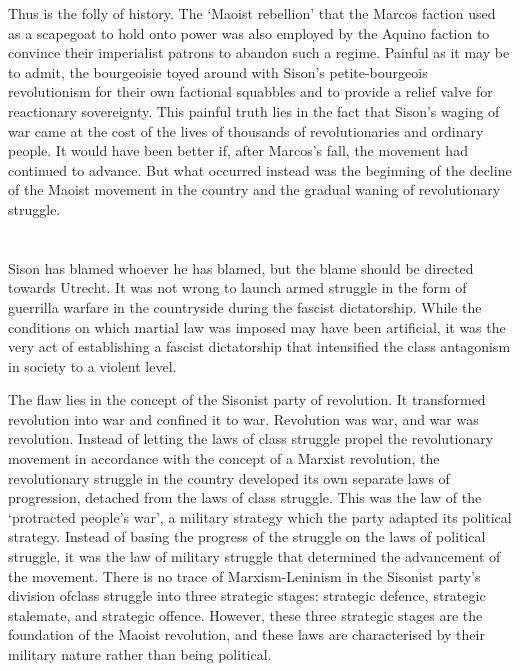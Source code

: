 Thus is the folly of history.
The `Maoist rebellion' that the Marcos faction used 
as a scapegoat to hold onto power 
was also employed by the Aquino faction 
to convince their imperialist patrons 
to abandon such a regime. 
Painful as it may be to admit, 
the bourgeoisie toyed around with Sison's petite-bourgeois revolutionism 
for their own factional squabbles 
and to provide a relief valve for reactionary sovereignty. 
This painful truth lies in the fact 
that Sison's waging of war 
came at the cost of the lives 
of thousands of revolutionaries and ordinary people. 
It would have been better if, after Marcos's fall, 
the movement had continued to advance. 
But what occurred instead was 
the beginning of the decline 
of the Maoist movement in the country 
and the gradual waning of revolutionary struggle.


\section{}
Sison has blamed whoever he has blamed,
but the blame should be directed towards Utrecht.
It was not wrong to launch armed struggle 
in the form of guerrilla warfare in the countryside 
during the fascist dictatorship. 
While the conditions on which martial law was imposed may have been artificial, 
it was the very act of establishing a fascist dictatorship 
that intensified the class antagonism in society to a violent level.

The flaw lies in the concept of the Sisonist party of revolution. 
It transformed revolution into war 
and confined it to war. 
Revolution was war, 
and war was revolution. 
Instead of letting the laws of class struggle 
propel the revolutionary movement 
in accordance with the concept of a Marxist revolution, 
the revolutionary struggle in the country 
developed its own separate laws of progression, 
detached from the laws of class struggle. 
This was the law of the `protracted people's war', 
a military strategy which the party adapted its political strategy. 
Instead of basing the progress of the struggle
on the laws of political struggle, 
it was the law of military struggle 
that determined the advancement of the movement. 
There is no trace of Marxism-Leninism 
in the Sisonist party's division ofclass struggle into three strategic stages: 
strategic defence, strategic stalemate, and strategic offence. 
However, 
these three strategic stages 
are the foundation of the Maoist revolution, 
and these laws are characterised 
by their military nature rather than being political.


